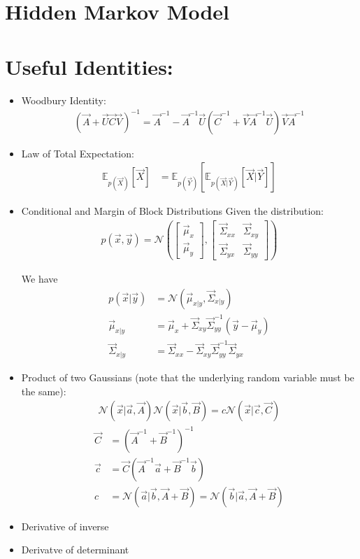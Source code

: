 \documentclass[12pt,twoside]{article}
\begin{document}
\section {Hidden Markov Model}



\section{Useful Identities:}

\begin{itemize}
\item Woodbury Identity:
	\begin{align*}
		(\vec{A} + \vec{U}\vec{C}\vec{V})^{-1} = \vec{A}^{-1}-\vec{A}^{-1} \vec{U}(\vec{C}^{-1}+\vec{V}\vec{A}^{-1}\vec{U})\vec{V}\vec{A}^{-1}
	\end{align*}

\item Law of Total Expectation:
	\begin{align*}
		\mathbb{E}_{p(\vec{X})}[\vec{X}] & =\mathbb{E}_{p(\vec{Y})}[\mathbb{E}_{p(\vec{X}\vert\vec{Y})}[\vec{X}\vert \vec{Y}]] 
	\end{align*}


\item Conditional and Margin of Block Distributions
Given the distribution:
\begin{align*}
p(\vec{x},\vec{y}) = \mathcal{N}\left(
\begin{bmatrix}
\vec{\mu}_x\\
\vec{\mu}_y
\end{bmatrix},
\begin{bmatrix}
\vec{\Sigma}_{xx}	& \vec{\Sigma}_{xy}\\
\vec{\Sigma}_{yx}	& \vec{\Sigma}_{yy}
\end{bmatrix}
\right)
\end{align*}

We have
\begin{align*}
p(\vec{x}\vert \vec{y})
& = \mathcal{N}\left(\vec{\mu}_{x\vert y}, \vec{\Sigma}_{x\vert y}\right)\\
\vec{\mu}_{x\vert y}
&=\vec{\mu}_x+ \vec{\Sigma}_{xy}\vec{\Sigma}_{yy}^{-1}(\vec {y} - \vec{\mu}_y)\\
\vec{\Sigma}_{x\vert y}
&=\vec{\Sigma}_{xx} - \vec{\Sigma}_{xy}\vec{\Sigma}_{yy}^{-1}\vec{\Sigma}_{yx}
\end{align*}

\item Product of two Gaussians (note that the underlying random variable must be the same):
\begin{align*}
\mathcal{N}(\vec{x}\vert \vec{a}, \vec{A})\mathcal{N}(\vec{x}\vert \vec{b}, \vec{B})= c\mathcal{N}(\vec{x}\vert \vec{c}, \vec{C})
\end{align*}
\begin{align*}
\vec{C} &= (\vec{A}^{-1}+\vec{B}^{-1})^{-1}\\
\vec{c} &= \vec{C}(\vec{A}^{-1}\vec{a}+\vec{B}^{-1}\vec{b})\\
c& = \mathcal{N}(\vec{a}\vert \vec{b}, \vec{A} + \vec{B}) = \mathcal{N}(\vec{b}\vert \vec{a}, \vec{A} + \vec{B})
\end{align*}

\item Derivative of inverse
\item Derivatve of determinant
\end{itemize}
\end{document}
